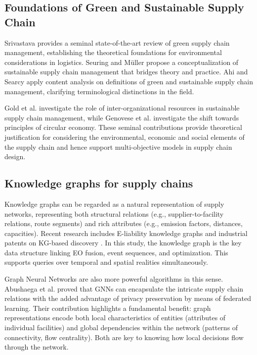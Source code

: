 \documentclass[conference]{IEEEtran}
\begin{document}
\subsection{Foundations of Green and Sustainable Supply Chain}
Srivastava \cite{srivastava2007green} provides a seminal state-of-the-art review of green supply chain management, establishing the theoretical foundations for environmental considerations in logistics. Seuring and M{\"u}ller \cite{seuring2008core} propose a conceptualization of sustainable supply chain management that bridges theory and practice. Ahi and Searcy \cite{ahi2013comparative} apply content analysis on definitions of green and sustainable supply chain management, clarifying terminological distinctions in the field.

Gold et al. \cite{gold2010sustainable} investigate the role of inter-organizational resources in sustainable supply chain management, while Genovese et al. \cite{genovese2017sustainable} investigate the shift towards principles of circular economy. These seminal contributions provide theoretical justification for considering the environmental, economic and social elements of the supply chain and hence support multi-objective models in supply chain design.

\subsection{Knowledge graphs for supply chains}
Knowledge graphs can be regarded as a natural representation of supply networks, representing both structural relations (e.g., supplier-to-facility relations, route segments) and rich attributes (e.g., emission factors, distances, capacities). Recent research includes E-liability knowledge graphs \cite{oladeji2023ai} and industrial patents on KG-based discovery \cite{ibm2023autodiscovery}. In this study, the knowledge graph is the key data structure linking EO fusion, event sequences, and optimization. This supports queries over temporal and spatial realities simultaneously.

Graph Neural Networks are also more powerful algorithms in this sense. Abushaega et al. \cite{abushaega2025multiobjective} proved that GNNs can encapsulate the intricate supply chain relations with the added advantage of privacy preservation by means of federated learning. Their contribution highlights a fundamental benefit: graph representations encode both local characteristics of entities (attributes of individual facilities) and global dependencies within the network (patterns of connectivity, flow centrality). Both are key to knowing how local decisions flow through the network.
\end{document}

